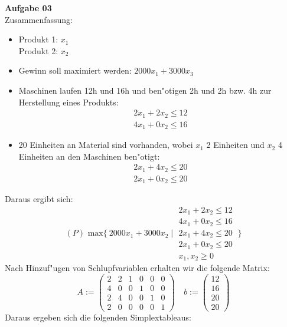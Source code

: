 \documentclass[a4paper,10pt]{article}
\begin{document}
	\parindent0pt
	\textbf{Aufgabe 03}\\
	Zusammenfassung:
	\begin{itemize}
		\item Produkt 1: $x_1$\\
		Produkt 2: $x_2$
		\item Gewinn soll maximiert werden: $2000x_1 + 3000x_3$
		\item Maschinen laufen 12h und 16h und ben"otigen 2h und 2h bzw. 4h zur Herstellung eines Produkts:
		\[
		\begin{matrix}
			2x_1 + 2x_2 \leq 12\\
			4x_1 + 0x_2 \leq 16
		\end{matrix}
		\]
		\item 20 Einheiten an Material sind vorhanden, wobei $x_1$ 2 Einheiten und $x_2$ 4 Einheiten an den Maschinen ben"otigt:
		\[
		\begin{matrix}
		2x_1 + 4x_2 \leq 20\\
		2x_1 + 0x_2 \leq 20
		\end{matrix}
		\]
	\end{itemize}
	Daraus ergibt sich:
	\[
	(P) \text{ max} \{\ 2000x_1 + 3000x_2 \mid \begin{matrix}
	2x_1 + 2x_2 \leq 12\\
	4x_1 + 0x_2 \leq 16\\
	2x_1 + 4x_2 \leq 20\\
	2x_1 + 0x_2 \leq 20\\
	x_1, x_2 \geq 0
	\end{matrix}
	\
	\}
	\]
	Nach Hinzuf"ugen von Schlupfvariablen erhalten wir die folgende Matrix:
	\[
	A:=
	\begin{pmatrix}
	2 & 2 & 1 & 0 & 0 & 0\\
	4 & 0 & 0 & 1 & 0 & 0\\
	2 & 4 & 0 & 0 & 1 & 0\\
	2 & 0 & 0 & 0 & 0 & 1
	\end{pmatrix} \quad b:= 
	\begin{pmatrix}
	12\\
	16\\
	20\\
	20
	\end{pmatrix}
	\]
	Daraus ergeben sich die folgenden Simplextableaus:\\
\end{document}
